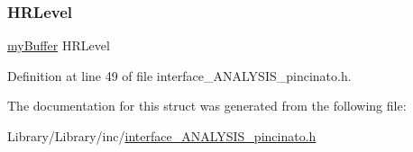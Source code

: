 \subsubsection{\texorpdfstring{H\+R\+Level}{HRLevel}}
{\footnotesize\ttfamily \mbox{\hyperlink{interface___a_n_a_l_y_s_i_s__pincinato_8h_a3184f2c2dc500ffc383f0a5e8e7f21f0}{my\+Buffer}} H\+R\+Level}



Definition at line 49 of file interface\+\_\+\+A\+N\+A\+L\+Y\+S\+I\+S\+\_\+pincinato.\+h.



The documentation for this struct was generated from the following file\+:\begin{DoxyCompactItemize}
\item 
Library/\+Library/inc/\mbox{\hyperlink{interface___a_n_a_l_y_s_i_s__pincinato_8h}{interface\+\_\+\+A\+N\+A\+L\+Y\+S\+I\+S\+\_\+pincinato.\+h}}\end{DoxyCompactItemize}
